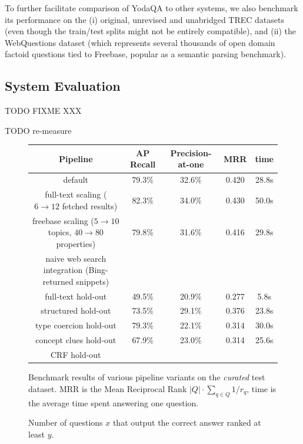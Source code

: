 To further facilitate comparison of YodaQA to other systems,
we also benchmark its performance on the (i) original, unrevised and
unabridged TREC datasets
(even though the train/test splits might not be entirely compatible),
and (ii) the WebQuestions dataset \cite{WebQuestions}
(which represents several thousands of open domain factoid questions
tied to Freebase, popular as a semantic parsing benchmark).

\subsection{System Evaluation}

TODO FIXME XXX

TODO re-measure

\begin{figure}[t]
\renewcommand{\arraystretch}{1.3}
\centering
\begin{tabular}{|c|cccc|}
\hline
Pipeline & AP Recall & Precision-at-one & MRR & time \\ \hline \hline
default & 79.3\% & 32.6\% & 0.420 & 28.8s \\
\hline
full-text scaling ($6\to12$ fetched results) & 82.3\% & 34.0\% & 0.430 & 50.0s \\
freebase scaling ($5\to10$ topics, $40\to80$ properties) & 79.8\% & 31.6\% & 0.416 & 29.8s \\
naive web search integration (Bing-returned snippets) & & & & \\
\hline
full-text hold-out & 49.5\% & 20.9\% & 0.277 & 5.8s \\
structured hold-out & 73.5\% & 29.1\% & 0.376 & 23.8s \\
\hline
type coercion hold-out & 79.3\% & 22.1\% & 0.314 & 30.0s \\
concept clues hold-out & 67.9\% & 23.0\% & 0.314 & 25.6s \\
CRF hold-out & & & & \\
\hline
\end{tabular}
\vspace*{-0.2cm}
\caption{Benchmark results of various pipeline variants on the \textit{curated} test dataset.
MRR is the Mean Reciprocal Rank $|Q|\cdot\sum_{q\in Q}{1/r_q}$, time is the average time spent answering one question.}
\label{fig:bench}
\end{figure}

\begin{figure}[t]
\begin{center}
\vspace*{-0.75cm}
\caption{Number of questions $x$ that output the correct answer ranked at least $y$.}
\label{fig:ranks}
\end{center}
\end{figure}%

